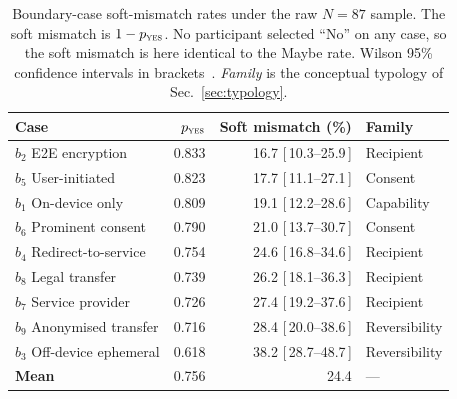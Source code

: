 \begin{table}[!htbp]
\centering\small
\caption{Boundary-case soft-mismatch rates under the raw $N{=}87$
sample. The soft mismatch is $1-p_\textsc{yes}$. No participant
selected ``No'' on any case, so the soft mismatch is here identical
to the Maybe rate. Wilson 95\% confidence intervals in
brackets~\citep{wilson:1927}. \emph{Family} is the conceptual
typology of Sec.~\ref{sec:typology}.}
\label{tab:mismatch-rates}
\renewcommand{\arraystretch}{1.15}
\begin{tabular}{l rr l}
\toprule
\textbf{Case} & $p_\textsc{yes}$ & Soft mismatch (\%) & \textbf{Family} \\
\midrule
$b_2$ E2E encryption          & 0.833 & 16.7 [\,10.3--25.9\,] & Recipient \\
$b_5$ User-initiated          & 0.823 & 17.7 [\,11.1--27.1\,] & Consent \\
$b_1$ On-device only          & 0.809 & 19.1 [\,12.2--28.6\,] & Capability \\
$b_6$ Prominent consent       & 0.790 & 21.0 [\,13.7--30.7\,] & Consent \\
$b_4$ Redirect-to-service     & 0.754 & 24.6 [\,16.8--34.6\,] & Recipient \\
$b_8$ Legal transfer          & 0.739 & 26.2 [\,18.1--36.3\,] & Recipient \\
$b_7$ Service provider        & 0.726 & 27.4 [\,19.2--37.6\,] & Recipient \\
$b_9$ Anonymised transfer     & 0.716 & 28.4 [\,20.0--38.6\,] & Reversibility \\
$b_3$ Off-device ephemeral    & 0.618 & 38.2 [\,28.7--48.7\,] & Reversibility \\
\midrule
\textbf{Mean}                 & 0.756 & 24.4 & --- \\
\bottomrule
\end{tabular}
\end{table}

